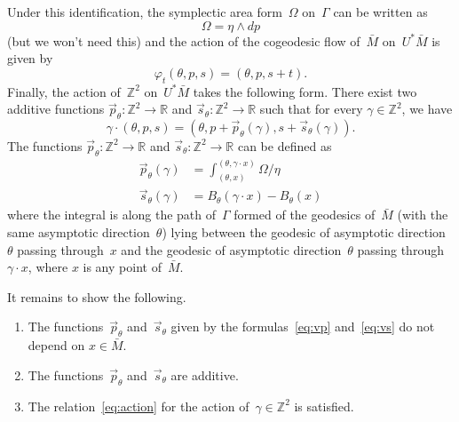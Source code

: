 \documentclass[AHL,Unicode,longabstracts,published]{cedram}
\newcommand{\Z}{\mathbb{Z}}
\newcommand{\R}{\mathbb{R}}
\begin{document}
Under this identification, the symplectic area form~$\Omega$ on~$\Gamma$ can be written as
\[
\Omega = \eta \wedge dp
\]
(but we won't need this) and the action of the cogeodesic flow of~$\bar{M}$ on~$U^*\bar{M}$ is given by
\begin{equation}\label{eq:s+t}
\varphi_t(\theta,p,s) = (\theta,p,s+t).
\end{equation}
Finally, the action of~$\Z^2$ on~$U^* \bar{M}$ takes the following form. There exist two additive functions $\vec{p}_\theta:\Z^2 \to \R$ and $\vec{s}_\theta:\Z^2 \to \R$ such that for every $\gamma \in \Z^2$, we have
\begin{equation}\label{eq:action}
\gamma \cdot (\theta,p,s) = \left(\theta,p+\vec{p}_\theta(\gamma),s+\vec{s}_\theta(\gamma)\right).
\end{equation}
The functions $\vec{p}_\theta:\Z^2 \to \R$ and $\vec{s}_\theta:\Z^2 \to \R$ can be defined as
\begin{align}
\vec{p}_\theta(\gamma) & = \int_{(\theta,x)}^{(\theta,\gamma \cdot x)} \Omega/\eta \label{eq:vp}
\\
\vec{s}_\theta(\gamma) & = B_\theta(\gamma \cdot x) - B_\theta(x) \label{eq:vs}
\end{align}
where the integral is along the path of~$\Gamma$ formed of the geodesics of~$\bar{M}$ (with the same asymptotic direction~$\theta$) lying between the geodesic of asymptotic direction~$\theta$ passing through~$x$ and the geodesic of asymptotic direction~$\theta$ passing through~$\gamma \cdot x$, where $x$ is any point of~$\bar{M}$.

It remains to show the following.

\begin{lemm}\leavevmode
\begin{enumerate}
\item\label{lemm12.3.1} The functions~$\vec{p}_\theta$ and~$\vec{s}_\theta$ given by the formulas~\eqref{eq:vp} and~\eqref{eq:vs} do not depend on $x\in\bar{M}$.
\item\label{lemm12.3.2} The functions~$\vec{p}_\theta$ and~$\vec{s}_\theta$ are additive.
\item\label{lemm12.3.3} The relation~\eqref{eq:action} for the action of~$\gamma \in \Z^2$ is satisfied.
\end{enumerate}
\end{lemm}
\end{document}
